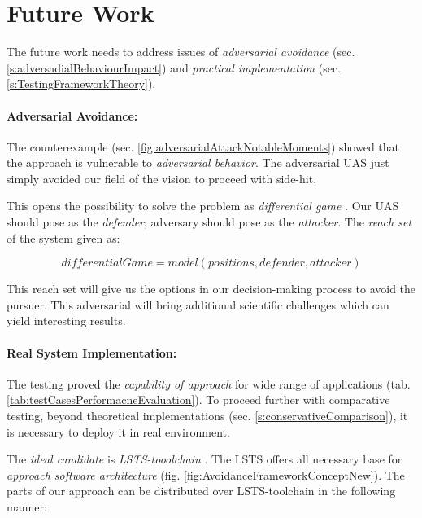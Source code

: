 \section{Future Work}\label{s:futureWork}

\noindent The future work needs to address issues of \emph{adversarial avoidance} (sec. \ref{s:adversadialBehaviourImpact}) and \emph{practical implementation} (sec. \ref{s:TestingFrameworkTheory}).

\paragraph{Adversarial Avoidance:} The counterexample (sec. \ref{fig:adversarialAttackNotableMoments}) showed that the approach is vulnerable to \emph{adversarial behavior}. The adversarial UAS just simply avoided our field of the vision to proceed with side-hit.

This opens the possibility to solve the problem as \emph{differential game} \cite{game1987,game1988}. Our UAS should pose as the \emph{defender}; adversary should pose as the \emph{attacker}. The \emph{reach set} of the system given as:

\begin{equation*}
    differential Game = model(positions, defender, attacker)
\end{equation*}

\noindent This reach set  will give us the options in our decision-making process to avoid the pursuer. This adversarial will bring additional scientific challenges which can yield interesting results.

\paragraph{Real System Implementation:} The testing proved the \emph{capability of approach} for wide range of applications (tab. \ref{tab:testCasesPerformacneEvaluation}). To proceed further with comparative testing, beyond theoretical implementations (sec. \ref{s:conservativeComparison}), it is necessary to deploy it in real environment.

The \emph{ideal candidate} is \emph{LSTS-tooolchain} \cite{pinto2013lsts}. The LSTS offers all necessary base for \emph{approach software architecture} (fig. \ref{fig:AvoidanceFrameworkConceptNew}). The parts of our approach can be distributed over LSTS-toolchain in the following manner:

